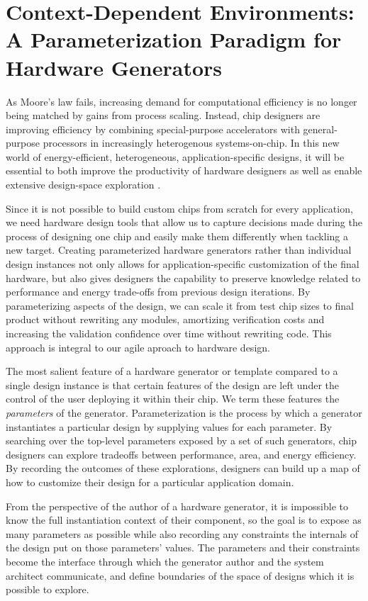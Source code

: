\chapter{Context-Dependent Environments: \\ A Parameterization Paradigm for Hardware Generators}
\label{c.parameters}

As Moore's law fails, increasing demand for computational efficiency is no longer being matched by gains from process scaling. 
Instead, chip designers are improving efficiency by combining special-purpose accelerators with general-purpose processors in increasingly heterogenous systems-on-chip.
In this new world of energy-efficient, heterogeneous, application-specific designs, it will be essential to both improve the productivity of hardware designers as well as enable extensive design-space exploration \cite{shacham-micro10}.

Since it is not possible to build custom chips from scratch for every application,
we need hardware design tools that allow us to capture decisions made
during the process of designing one chip and easily make them differently when tackling a new target.
Creating parameterized hardware generators rather than individual design instances not only allows for application-specific customization of the final hardware,
but also gives designers the capability to preserve
knowledge related to performance and energy trade-offs from previous design iterations.
By parameterizing aspects of the design, we can scale it from test chip sizes to final product without rewriting any modules, amortizing verification costs and increasing the validation confidence over time without rewriting code.
This approach is integral to our agile aproach to hardware design.

The most salient feature of a hardware generator or template compared to a single design instance is that certain features of the design are left under the control of the user deploying it within their chip.
We term these features the {\em parameters} of the generator.
Parameterization is the process by which a generator instantiates a particular design by supplying values for each parameter.
By searching over the top-level parameters exposed by a set of such generators, chip designers can explore tradeoffs between performance, area, and energy efficiency.
By recording the outcomes of these explorations, designers can build up a map of how to customize their design for a particular application domain.

From the perspective of the author of a hardware generator, it is impossible to know the full instantiation context of their component, so the goal is to expose as many parameters as possible while also recording any constraints the internals of the design put on those parameters' values.
The parameters and their constraints become the interface through which the generator author and the system architect communicate, and define boundaries of the space of designs which it is possible to explore.

